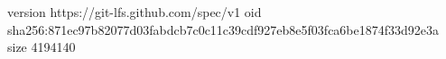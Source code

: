 version https://git-lfs.github.com/spec/v1
oid sha256:871ec97b82077d03fabdcb7c0c11c39cdf927eb8e5f03fca6be1874f33d92e3a
size 4194140
